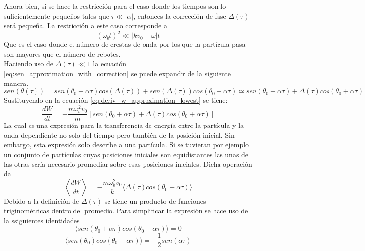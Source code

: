 \documentclass[../tesis_main_file.tex]{subfiles}
\begin{document}
Ahora bien, si se hace la restricción para el caso donde los tiempos son lo suficientemente pequeños tales que $\tau \ll |\alpha|$, entonces la corrección de fase $\Delta(\tau)$ será pequeña. La restricción a este caso corresponde a 
\begin{equation}
\label{eq:restriccion_timepos_transferencia_ener}
(\omega_b t)^2 \ll |kv_0-\omega|t
\end{equation}
Que es el caso donde el número de crestas de onda por los que la partícula pasa son mayores que el número de rebotes.\\
Haciendo uso de $\Delta(\tau) \ll 1$ la ecuación \ref{eq:sen_approximation_with_correction} se puede expandir de la siguiente manera.
\begin{equation}
\label{eq:sen_correcion_expansion}
sen(\theta(\tau))=sen(\theta_0 + \alpha\tau)cos(\Delta(\tau))+sen(\Delta(\tau))cos(\theta_0 + \alpha\tau)\simeq sen(\theta_0 +\alpha\tau)+\Delta(\tau)cos(\theta_0 + \alpha\tau)
\end{equation}
Sustituyendo en la ecuación \ref{eq:deriv_w_approximation_lowest} se tiene:
\begin{equation}
\label{eq:deriv_w_t_correction_approximation}
\frac{dW}{dt}= -\frac{m\omega_b^2v_0}{m}[sen(\theta_0 +\alpha\tau)+\Delta(\tau)cos(\theta_0 + \alpha\tau)]
\end{equation}
La cual es una expresión para la transferencia de energía entre la partícula y la onda dependiente no solo del tiempo pero también de la posición inicial. Sin embargo, esta expresión solo describe a una partícula. Si se tuvieran por ejemplo un conjunto de partículas cuyas posiciones iniciales son equidistantes las unas de las otras sería necesario promediar sobre esas posiciones iniciales. Dicha operación da 
\begin{equation}
\label{eq:promedio_w_primer}
\left\langle \frac{dW}{dt}\right\rangle= -\frac{m\omega_b^2v_0}{k}\langle\Delta(\tau)cos(\theta_0 + \alpha\tau)\rangle
\end{equation}
Debido a la definición de $\Delta(\tau)$ se tiene un producto de funciones triginométricas dentro del promedio. Para simplificar la expresión se hace uso de la ssiguientes identidades
\begin{equation}
\langle sen(\theta_0 +\alpha\tau)cos(\theta_0 +\alpha\tau)\rangle=0
\end{equation}
\begin{equation}
\langle sen(\theta_0)cos(\theta_0 +\alpha\tau)\rangle =-\frac{1}{2}sen(\alpha\tau)
\end{equation}
\end{document}
